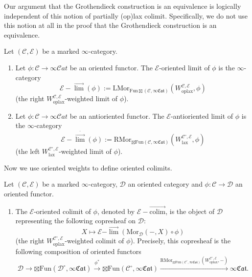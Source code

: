 \documentclass[10pt,oneside]{article}
\numberwithin{equation}{section} %
\numberwithin{figure}{section} %
\theoremstyle{plain}
\theoremstyle{definition}
\newcommand{\mC}{{\mathcal C}}
\newcommand{\mD}{{\mathcal D}}
\newcommand{\mE}{{\mathcal E}}
\renewcommand{\L}{{\mathrm L}}
\newcommand{\R}{{\mathrm R}}
\newcommand{\W}{W}
\newcommand{\colim}{\mathrm{colim}}
\newcommand{\Fun}{\mathrm{Fun}}
\newcommand{\lax}{{\mathrm{lax}}}
\newcommand{\oplax}{{\mathrm{oplax}}}
\newcommand{\Mor}{{\mathrm{Mor}}}
\newcommand{\scat}{\mathcal{C}\mathit{at}}
\begin{document}
\begin{remark}
Our argument that the Grothendieck construction is an equivalence is logically independent of this notion of partially (op)lax colimit.
Specifically, we do not use this notion at all in the proof that the Grothendieck construction is an equivalence.    
\end{remark}

\begin{definition}
Let $(\mC, \mE)$ be a marked $\infty$-category.

\begin{enumerate}[\normalfont(1)]\setlength{\itemsep}{-2pt}

\item Let $\phi: \mC \to \infty\scat$ be an oriented functor.
The $\mE$-oriented limit of $\phi$ is the $\infty$-category
$$ \mE-\overset{\to}{\lim}(\phi):=\L\Mor_{\Fun\boxtimes(\mC,\infty\mathfrak{Cat})}(\W^{\mC,\mE}_\oplax, \phi)$$
(the right $\W^{\mC,\mE}_\oplax$-weighted limit of $\phi$).

\item Let $\phi: \mC \to \infty\scat$ be an antioriented functor.
The $\mE$-antioriented limit of $\phi$ is the $\infty$-category
$$ \mE-\overset{\bar{\to}}{\lim}(\phi):=\R\Mor_{\boxtimes\Fun(\mC,\infty\mathfrak{Cat})}(\W^{\mC^\circ,\mE}_\lax, \phi)$$
(the left $\W^{\mC^\circ,\mE}_\lax$-weighted limit of $\phi$).

\end{enumerate}


Now we use oriented weights to define oriented colimits.

\begin{definition}

Let $(\mC, \mE)$ be a marked $\infty$-category, $\mD$ an oriented category and $\phi: \mC \to \mD$ an oriented functor. 

\begin{enumerate}[\normalfont(1)]\setlength{\itemsep}{-2pt}

\item The $\mE$-oriented colimit of $\phi$, denoted by $ \mE-\overset{\to}{\colim} $, is the object of $\mD$ representing the following copresheaf on $\mD:$
$$ X \mapsto \mE \mathrm{-} \overset{\to}{\lim}(\mathrm{Mor}_\mD(-,X)\circ \phi)$$
(the right $\W^{\mC^\circ,\mE}_\oplax$-weighted colimit of $\phi$).
Precisely, this copresheaf is the following composition of oriented functors
$$ \mD \to {\boxtimes\Fun}(\mD^\circ,\infty\mathfrak{Cat}) \xrightarrow{\phi^*} {\boxtimes\Fun}(\mC^\circ,\infty\mathfrak{Cat}) \xrightarrow{\R\Mor_{\boxtimes\Fun(\mC^\circ,\infty\mathfrak{Cat})}(\W^{\mC^\circ,\mE}_\oplax, -)} \infty\mathfrak{Cat}.$$


\end{enumerate}
\end{definition}
\end{definition}
\end{document}
